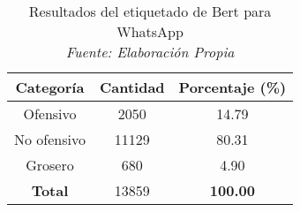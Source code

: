 \begin{itemize}
\begin{table}[!ht]
	\centering
	\begin{tabular}{|c|c|c|}
		\hline
		\textbf{Categoría} & \textbf{Cantidad} & \textbf{Porcentaje (\%)} \\ \hline
		Ofensivo & 2050 & 14.79 \\ 
		No ofensivo & 11129 & 80.31 \\ 
		Grosero & 680 & 4.90 \\ \hline
		\textbf{Total} & 13859 & \textbf{100.00} \\ \hline
	\end{tabular}
	\caption{Resultados del etiquetado de Bert para WhatsApp
		\\\textit{Fuente: Elaboración Propia}}
	\label{tbl:whatsapp}
\end{table}
\end{itemize}
